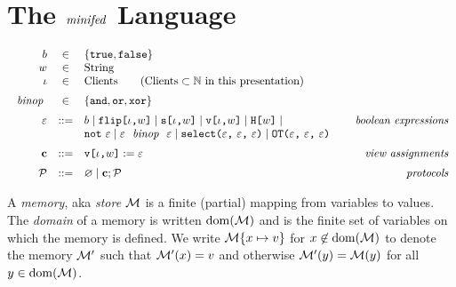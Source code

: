\section{The $\mathit{minifed}$ Language}


$$
\begin{array}{rcl@{\hspace{8mm}}r}
b &\in& \{ \etrue, \efalse \} \\
w &\in& \mathrm{String} \\ 
\cid &\in& \mathrm{Clients} \qquad  (\mathrm{Clients} \subset \mathbb{N} \text{\ in\ this\ presentation})\\[2mm]
\bop &\in& \{ \eand, \eor, \exor \} \\[2mm]
\be &::=& b \mid \flip{\cid}{w} \mid \secret{\cid}{w} \mid \view{\cid}{w} \mid \oracle{w} \mid & \textit{boolean expressions}\\
& &  \enot\ \be \mid \be\ \bop\ \be \mid \select{\be}{\be}{\be} \mid \OT{\be}{\be}{\be} \\[2mm]
\instr &::=& \eassign{\view{\cid}{w}}{\be} & \textit{view assignments} \\[2mm]
\prog &::=& \varnothing \mid \instr; \prog & \textit{protocols}
\end{array}
$$

\begin{definition}[Memories]
A \emph{memory}, aka \emph{store} $\mathcal{M}$ is a finite (partial) mapping from variables to values.
The \emph{domain} of a memory is written $\mathrm{dom}(\mathcal{M})$ and is the finite
set of variables on which the memory is defined. We write $\mathcal{M}\{ x \mapsto v\}$
for  $x\not\in\mathrm{dom}(\mathcal{M})$ to denote the memory $\mathcal{M}'$ such that $\mathcal{M}'(x) = v$ and otherwise
$\mathcal{M}'(y) = \mathcal{M}(y)$ for all $y \in \mathrm{dom}(\mathcal{M})$.
\end{definition}


